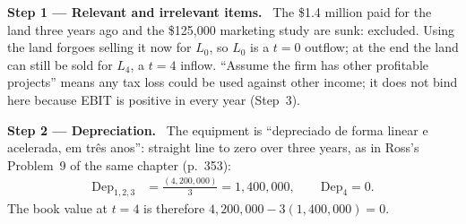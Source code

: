\documentclass[11pt,a4paper]{article}
\numberwithin{equation}{section}
\newcommand{\step}[2]{\par\medskip\noindent\textbf{Step #1 --- #2.}~}
\newcommand{\pt}{\foreignlanguage{brazilian}}
\begin{document}
\step{1}{Relevant and irrelevant items} The \$1.4 million paid for the land three years ago and
the \$125{,}000 marketing study are sunk: excluded. Using the land forgoes selling it now for
$L_0$, so $L_0$ is a $t=0$ outflow; at the end the land can still be sold for $L_4$, a $t=4$
inflow. ``Assume the firm has other profitable projects'' means any tax loss could be used
against other income; it does not bind here because EBIT is positive in every year
(Step~3).

\step{2}{Depreciation} The equipment is ``\pt{depreciado de forma linear e acelerada, em tr\^es
anos}'': straight line to zero over three years, as in Ross's Problem~9 of the same chapter (p.~353):
\begin{align}
  \mathrm{Dep}_{1,2,3} &= \frac{(4{,}200{,}000)}{3} = 1{,}400{,}000, \qquad \mathrm{Dep}_4 = 0. \label{eq:13dep}
\end{align}
The book value at $t=4$ is therefore $4{,}200{,}000-3(1{,}400{,}000)=0$.
\end{document}
